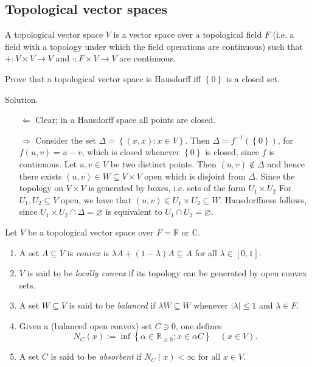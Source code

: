 \documentclass[12pt, reqno,a4paper, twoside]{amsproc}
\renewcommand{\O}{\varnothing}
\newcommand{\dbR}{\mathbb R}
\newcommand{\dbC}{\mathbb C}
\newcommand{\set}[1]{\left\{{#1}\right\}}
\newcommand{\abs}[1]{\left|#1\right|}
\newenvironment{sol}{\sc Solution. \rm}{\hfill \qedsymbol\bigskip}
\begin{document}
\subsection{Topological vector spaces}
\begin{defi}
	A topological vector space $V$ is a vector space over a topological field $F$ (i.e. a field with a topology under which the field operations are continuous) such that $+:V\times V\to V$ and $\cdot:F\times V\to V$ are continuous. 
\end{defi}
\begin{exer}
	Prove that a topological vector space is Hausdorff iff $\set{0}$ is a closed set.
\end{exer}
\begin{sol}
	\begin{itemize}
		\item[$\Leftarrow$] 
		Clear; in a Hausdorff space all points are closed.
		\item[$\Rightarrow$] 
		Consider the set $\Delta=\set{(x,x):x\in V}$. Then $\Delta=f^{-1}(\set{0})$, for $f(u,v)=u-v$, which is closed whenever $\set{0}$ is closed, since $f$ is continuous. Let $u,v\in V$ be two distinct points. Then $(u,v)\notin \Delta$ and hence there exists $(u,v)\in  W\subseteq V\times V$ open which is disjoint from $\Delta$. Since the topology on $V\times V$ is generated by boxes, i.e. sets of the form $U_1\times U_2$ For $U_1,U_2\subseteq V$ open, we have that $(u,v)\in U_1\times U_2\subseteq W$. Hausdorffness follows, since $U_1\times U_2\cap \Delta=\O$ is equivalent to $U_1\cap U_2=\O$. 
	\end{itemize}
\end{sol}
\begin{defi}
	Let $V$ be a topological vector space over $F=\dbR$ or $\dbC$.
	\begin{enumerate}
		\item A set $A\subseteq V$ is \emph{convex} is $\lambda A+(1-\lambda)A\subseteq A$ for all $\lambda\in[0,1]$. 
		\item $V$ is said to be \emph{locally convex} if its topology can be generated by open convex sets.
		\item  A set $W\subseteq V$ is said to be \emph{balanced} if $\lambda W\subseteq W$ whenever $\abs{\lambda}\le 1$ and $\lambda\in F$. 
		\item  Given a (balanced open convex) set $C\ni 0$, one defines
		\[N_C(x):=\inf\set{\alpha\in \dbR_{\ge 0}:x\in \alpha C}\quad(x\in V).\]
		\item  A set $C$ is said to be \emph{absorbent} if $N_C(x)<\infty$ for all $x\in V$.
	\end{enumerate}
\end{defi}
\end{document}
